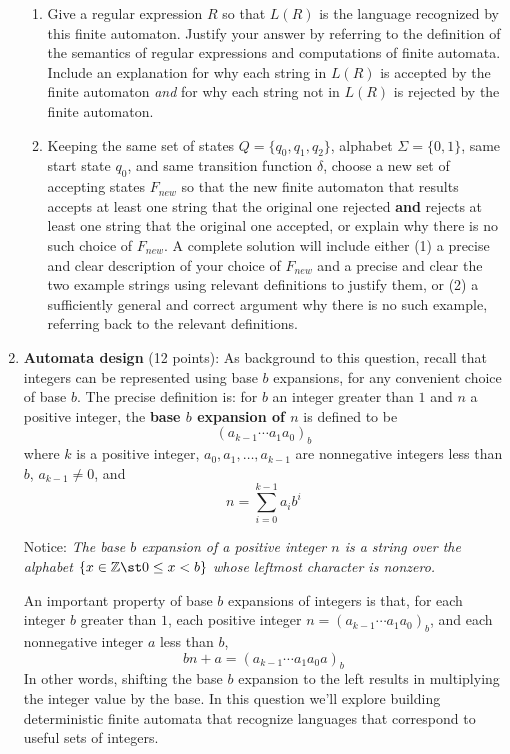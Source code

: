 \begin{enumerate}[wide, labelwidth=!, labelindent=0pt]
\begin{enumerate}
    \item\gradeCorrect Give a regular expression $R$ so that $L(R)$ is the language 
    recognized by this finite automaton. Justify your answer by referring to the 
    definition of the semantics of regular expressions and computations of finite automata. 
    Include an explanation for why each string in $L(R)$ is accepted by the finite automaton {\it and}
    for why each string not in $L(R)$ is rejected by the finite automaton.

    \item\gradeCorrect Keeping the same set of states $Q = \{q_0, q_1, q_2\}$, alphabet $\Sigma = \{0,1\}$, 
    same start state $q_0$, and same transition 
    function $\delta$, choose a new set of accepting states $F_{new}$ so that the new 
    finite automaton that results accepts at least one string that the original one rejected {\bf and} rejects
    at least one string that the original one accepted, or explain why there is no such choice of $F_{new}$.
    A complete solution will include either (1) a precise and
    clear description of your choice of $F_{new}$
    and a precise and clear the two example strings using relevant definitions 
    to justify them, or (2) a sufficiently general and correct argument
    why there is no such example, referring back to the relevant definitions.

    \end{enumerate}
\item \textbf{Automata design} (12 points):
As background to this question, recall that integers can be represented using base $b$ expansions, for 
any convenient choice of base $b$. The precise definition is:
for $b$ an integer greater than $1$ and $n$ a positive integer, 
the {\bf base $b$ expansion of $n$}  is defined to be
\[
(a_{k-1} \cdots a_1 a_0)_b
\]
where $k$ is a positive integer, $a_0, a_1, \ldots, a_{k-1}$ 
are nonnegative integers less than $b$, $a_{k-1} \neq  0$, and
\[
n =  \sum_{i=0}^{k-1} a_{i} b^{i}
\]

Notice: {\it The base $b$ expansion of a positive integer $n$ is a string over the alphabet 
$\{x \in \mathbb{Z} \st 0 \leq x < b\}$
whose leftmost character is nonzero.}

An important property of base $b$ expansions of integers is that, for each integer $b$ greater than $1$,
each positive integer $n = (a_{k-1} \cdots a_1 a_0)_b$, and each nonnegative integer $a$ less than $b$, 
\[
    bn + a = (a_{k-1} \cdots a_1 a_0a)_b
\]
In other words, shifting the base $b$ expansion to the left results in multiplying the integer value by the base.
In this question we'll explore building deterministic finite automata that recognize 
languages that correspond to useful sets of integers.


\end{enumerate}
